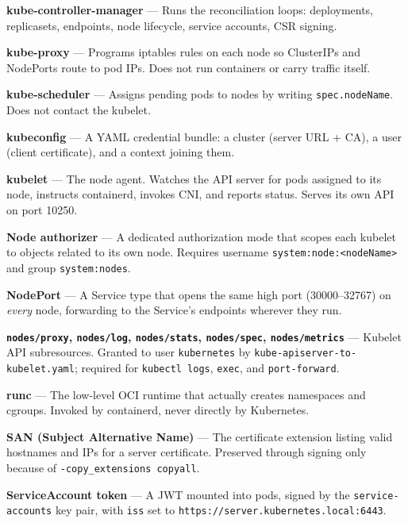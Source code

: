\documentclass[11pt,oneside]{report}
\begin{document}
\textbf{kube-controller-manager}
--- Runs the
reconciliation
loops: deployments,
replicasets,
endpoints, node
lifecycle, service
accounts, CSR
signing.

\textbf{kube-proxy}
--- Programs
iptables rules on
each node so
ClusterIPs and
NodePorts route to
pod IPs. Does not
run containers or
carry traffic
itself.

\textbf{kube-scheduler}
--- Assigns pending
pods to nodes by
writing
\texttt{spec.nodeName}.
Does not contact the
kubelet.

\textbf{kubeconfig}
--- A YAML
credential bundle: a
cluster (server URL
+ CA), a user
(client
certificate), and a
context joining
them.

\textbf{kubelet} ---
The node agent.
Watches the API
server for pods
assigned to its
node, instructs
containerd, invokes
CNI, and reports
status. Serves its
own API on port
10250.

\textbf{Node
authorizer} --- A
dedicated
authorization mode
that scopes each
kubelet to objects
related to its own
node. Requires
username
\texttt{system:}\allowbreak{}\texttt{node:}\allowbreak{}\texttt{\textless{}nodeName\textgreater{}}
and group
\texttt{system:nodes}.

\textbf{NodePort}
--- A Service type
that opens the same
high port
(30000--32767) on
\emph{every} node,
forwarding to the
Service's endpoints
wherever they run.

\textbf{\texttt{nodes/proxy},
\texttt{nodes/log},
\texttt{nodes/stats},
\texttt{nodes/spec},
\texttt{nodes/metrics}}
--- Kubelet API
subresources.
Granted to user
\texttt{kubernetes}
by
\texttt{kube-}\allowbreak{}\texttt{apiserver-}\allowbreak{}\texttt{to-}\allowbreak{}\texttt{kubelet.}\allowbreak{}\texttt{yaml};
required for
\texttt{kubectl\ logs},
\texttt{exec}, and
\texttt{port-forward}.

\textbf{runc} ---
The low-level OCI
runtime that
actually creates
namespaces and
cgroups. Invoked by
containerd, never
directly by
Kubernetes.

\textbf{SAN (Subject
Alternative Name)}
--- The certificate
extension listing
valid hostnames and
IPs for a server
certificate.
Preserved through
signing only because
of
\texttt{-}\allowbreak{}\texttt{copy\_extensions\ copyall}.

\textbf{ServiceAccount
token} --- A JWT
mounted into pods,
signed by the
\texttt{service-}\allowbreak{}\texttt{accounts}
key pair, with
\texttt{iss} set to
\texttt{https:}\allowbreak{}\texttt{/}\allowbreak{}\texttt{/}\allowbreak{}\texttt{server.}\allowbreak{}\texttt{kubernetes.}\allowbreak{}\texttt{local:}\allowbreak{}\texttt{6443}.
\end{document}

